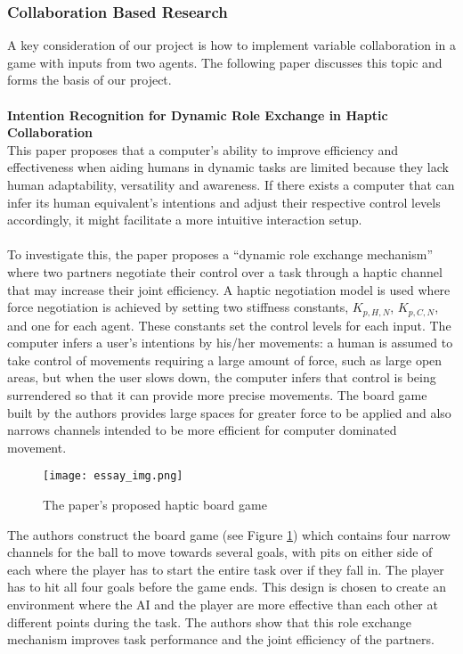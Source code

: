 \documentclass[a4paper]{article}
\begin{document}
\subsubsection{Collaboration Based Research}
A key consideration of our project is how to implement variable collaboration in a game with inputs from two agents. The following paper discusses this topic and forms the basis of our project.
\\ \\ \textbf{Intention Recognition for Dynamic Role Exchange in Haptic Collaboration \cite{ref3}} \\
This paper proposes that a computer’s ability to improve efficiency and effectiveness when aiding humans in dynamic tasks are limited because they lack human adaptability, versatility and awareness. If there exists a computer that can infer its human equivalent’s intentions and adjust their respective control levels accordingly, it might facilitate a more intuitive interaction setup. 
\\ \\ 
To investigate this, the paper proposes a “dynamic role exchange mechanism” where two partners negotiate their control over a task through a haptic channel that may increase their joint efficiency. A haptic negotiation model is used where force negotiation is achieved by setting two stiffness constants, $K_{p,H,N}$, $K_{p,C,N}$, and one for each agent. These constants set the control levels for each input. The computer infers a user’s intentions by his/her movements: a human is assumed to take control of movements requiring a large amount of force, such as large open areas, but when the user slows down, the computer infers that control is being surrendered so that it can provide more precise movements. The board game built by the authors provides large spaces for greater force to be applied and also narrows channels intended to be more efficient for computer dominated movement.

\begin{figure}[H]
    \centering
    \texttt{[image: essay\_img.png]}
    \caption{The paper’s proposed haptic board game}
    \label{fig:essay_img}
\end{figure}

\noindent The authors construct the board game (see Figure \ref{fig:essay_img}) which contains four narrow channels for the ball to move towards several goals, with pits on either side of each where the player has to start the entire task over if they fall in. The player has to hit all four goals before the game ends. This design is chosen to create an environment where the AI and the player are more effective than each other at different points during the task. The authors show that this role exchange mechanism improves task performance and the joint efficiency of the partners.
\end{document}

